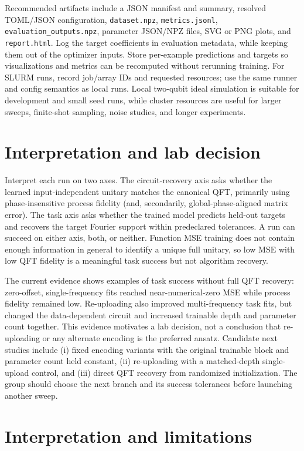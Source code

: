 \documentclass[11pt]{article}
\begin{document}
Recommended artifacts include a JSON manifest and summary, resolved TOML/JSON configuration, \texttt{dataset.npz}, \texttt{metrics.jsonl}, \texttt{evaluation_outputs.npz}, parameter JSON/NPZ files, SVG or PNG plots, and \texttt{report.html}. Log the target coefficients in evaluation metadata, while keeping them out of the optimizer inputs. Store per-example predictions and targets so visualizations and metrics can be recomputed without rerunning training. For SLURM runs, record job/array IDs and requested resources; use the same runner and config semantics as local runs. Local two-qubit ideal simulation is suitable for development and small seed runs, while cluster resources are useful for larger sweeps, finite-shot sampling, noise studies, and longer experiments.

\section{Interpretation and lab decision}

Interpret each run on two axes. The circuit-recovery axis asks whether the learned input-independent unitary matches the canonical QFT, primarily using phase-insensitive process fidelity (and, secondarily, global-phase-aligned matrix error). The task axis asks whether the trained model predicts held-out targets and recovers the target Fourier support within predeclared tolerances. A run can succeed on either axis, both, or neither. Function MSE training does not contain enough information in general to identify a unique full unitary, so low MSE with low QFT fidelity is a meaningful task success but not algorithm recovery.

The current evidence shows examples of task success without full QFT recovery: zero-offset, single-frequency fits reached near-numerical-zero MSE while process fidelity remained low. Re-uploading also improved multi-frequency task fits, but changed the data-dependent circuit and increased trainable depth and parameter count together. This evidence motivates a lab decision, not a conclusion that re-uploading or any alternate encoding is the preferred ansatz. Candidate next studies include (i) fixed encoding variants with the original trainable block and parameter count held constant, (ii) re-uploading with a matched-depth single-upload control, and (iii) direct QFT recovery from randomized initialization. The group should choose the next branch and its success tolerances before launching another sweep.

\section{Interpretation and limitations}
\end{document}
